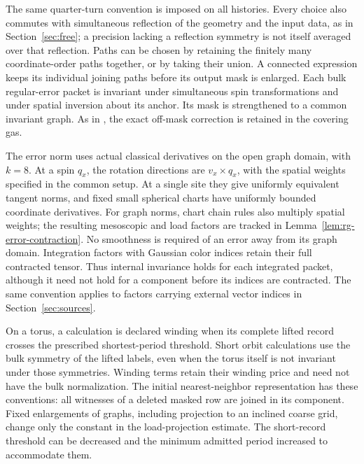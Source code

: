 The same quarter-turn convention is imposed on all histories.  Every
choice also commutes with simultaneous reflection of the geometry and
the input data, as in Section~\ref{sec:free}; a precision lacking a
reflection symmetry is not itself averaged over that reflection.
Paths can be chosen by retaining the finitely many coordinate-order
paths together, or by taking their union.  A connected expression keeps
its individual joining paths before its output mask is enlarged.
Each bulk regular-error packet is invariant under simultaneous spin
transformations and under spatial inversion about its anchor.  Its
mask is strengthened to a common invariant graph.  As in
, the exact off-mask correction is retained in the
covering gas.

The error norm uses actual classical derivatives on the open graph
domain, with $k=8$.  At a spin $q_x$, the rotation directions are
$v_x\times q_x$, with the spatial weights specified in the common
setup.  At a single site they give uniformly equivalent tangent norms, and
fixed small spherical charts have uniformly bounded coordinate
derivatives.  For graph norms, chart chain rules also multiply spatial
weights; the resulting mesoscopic and load factors are tracked in
Lemma~\ref{lem:rg-error-contraction}.  No smoothness is required of an error away from its graph domain.
Integration factors with Gaussian color indices retain their full
contracted tensor.  Thus internal invariance holds for each integrated
packet, although it need not hold for a component before its indices
are contracted.  The same convention applies to factors carrying
external vector indices in Section~\ref{sec:sources}.

On a torus, a calculation is declared winding when its complete lifted
record crosses the prescribed shortest-period threshold.  Short orbit
calculations use the bulk symmetry of the lifted labels, even when the
torus itself is not invariant under those symmetries.  Winding terms
retain their winding price and need not have the bulk normalization.
The initial nearest-neighbor representation has these conventions:
all witnesses of a deleted masked row are joined in its component.
Fixed enlargements of graphs, including projection to an inclined
coarse grid, change only the constant in the load-projection estimate.
The short-record threshold can be decreased and the minimum admitted
period increased to accommodate them.

